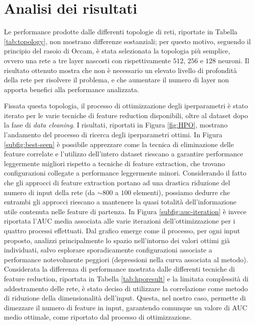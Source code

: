 \section{Analisi dei risultati}
Le performance prodotte dalle differenti topologie di reti, riportate in Tabella \ref{tab:topology}, non mostrano differenze sostanziali; per questo motivo, seguendo il principio del rasoio di Occam, è stata selezionata la topologia più semplice, ovvero una rete a tre layer nascosti con rispettivamente $512$, $256$ e $128$ neuroni. 
Il risultato ottenuto mostra che non è necessario un elevato livello di profondità della rete per risolvere il problema, e che aumentare il numero di layer non apporta benefici alla performance analizzata.

Fissata questa topologia, il processo di ottimizzazione degli iperparametri è stato iterato per le varie tecniche di feature reduction disponibili, oltre al dataset dopo la fase di \textit{data cleaning}. 
I risultati, riportati in Figura \ref{fig:HPO}, mostrano l'andamento del processo di ricerca degli iperparametri ottimi. 
In Figura \ref{subfig:best-seen} è possibile apprezzare come la tecnica di eliminazione delle feature correlate e l'utilizzo dell'intero dataset riescano a garantire performance leggermente migliori rispetto a tecniche di feature extraction, che trovano configurazioni collegate a performance leggermente minori. 
Considerando il fatto che gli approcci di feature extraction portano ad una drastica riduzione del numero di input della rete (da $\sim800$ a $100$ elementi), possiamo dedurre che entrambi gli approcci riescano a mantenere la quasi totalità dell'informazione utile contenuta nelle feature di partenza. 
In Figura \ref{subfig:auc-iteration} è invece riportata l'AUC media associata alle varie iterazioni dell'ottimizzazione per i quattro processi effettuati. 
Dal grafico emerge come il processo, per ogni input proposto, analizzi principalmente lo spazio nell'intorno dei valori ottimi già individuati, salvo esplorare sporadicamente configurazioni associate a performance notevolmente peggiori (depressioni nella curva associata al metodo).\\
Considerata la differenza di performance mostrata dalle differenti tecniche di feature reduction, riportata in Tabella \ref{tab:hporesult} e la limitata complessità di addestramento delle rete, è stato deciso di utilizzare la correlazione come metodo di riduzione della dimensionalità dell'input. 
Questa, nel nostro caso, permette di dimezzare il numero di feature in input, garantendo comunque un valore di AUC medio ottimale, come riportato dal processo di ottimizzazione. 

